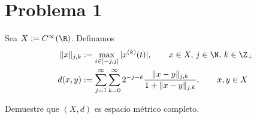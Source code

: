 \documentclass[duedate = 11 de Septiembre, 
			ramo = An\'alisis Funcional, 
			doctype = Tarea 1,
			semester = 2,
			year = 2017]{tarea}
\begin{document}
\begin{titlepage} 
\dotitlepage
\end{titlepage}


\pagestyle{empty}

\section*{Problema 1}
Sea $X := C^{\infty}(\R)$. Definamos
	\begin{align*}
		\|x\|_{j,k}	
			&:=	\max_{i \in [-j,j]} |x^{(k)}(t)|, \qquad x \in X, \, j \in \N, \, k \in \Z_{+}	\\
		d(x,y)
			&:=	\sum_{j=1}^{\infty} \sum_{k=0}^{\infty} 2^{-j-k} \frac{\|x-y\|_{j,k}}{1 + \|x-y\|_{j,k}}, \qquad x,y \in X 
	\end{align*}

Demuestre que $(X,d)$ es espacio métrico completo.
\end{document}
